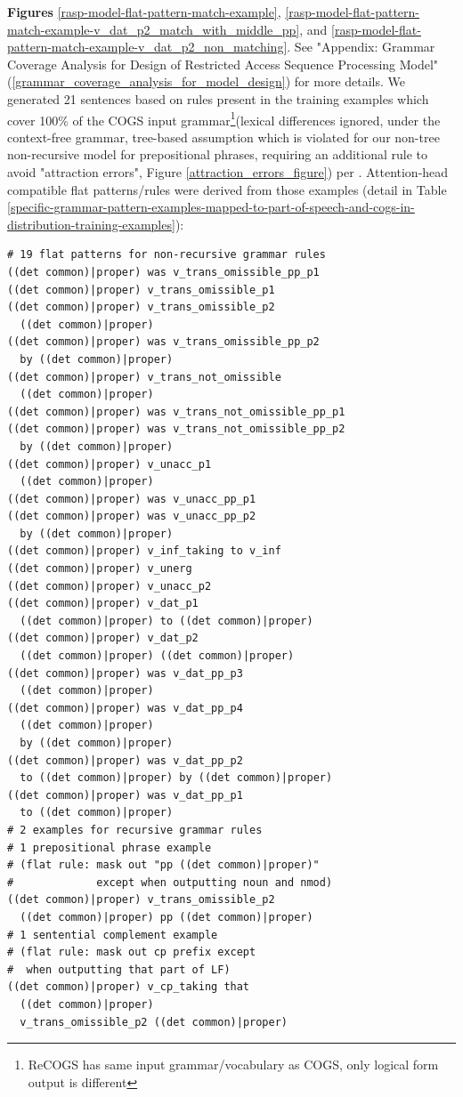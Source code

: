 \documentclass[11pt]{article}
\begin{document}
\textbf{Figures} \ref{rasp-model-flat-pattern-match-example}, \ref{rasp-model-flat-pattern-match-example-v_dat_p2_match_with_middle_pp}, and \ref{rasp-model-flat-pattern-match-example-v_dat_p2_non_matching}. See "Appendix: Grammar Coverage Analysis for Design of Restricted Access Sequence Processing Model" (\ref{grammar_coverage_analysis_for_model_design}) for more details. We generated 21 sentences based on rules present in the training examples which cover 100\% of the COGS input grammar\footnote{ReCOGS has same input grammar/vocabulary as COGS, only logical form output is different}(lexical differences ignored, under the context-free grammar, tree-based assumption which is violated for our non-tree non-recursive model for prepositional phrases, requiring an additional rule to avoid "attraction errors", Figure \ref{attraction_errors_figure}) per \cite{fuzzingbook2023:GrammarCoverageFuzzer}.
Attention-head compatible flat patterns/rules were derived from those examples (detail in Table \ref{specific-grammar-pattern-examples-mapped-to-part-of-speech-and-cogs-in-distribution-training-examples}):
\begin{tiny}
\begin{verbatim}
# 19 flat patterns for non-recursive grammar rules
((det common)|proper) was v_trans_omissible_pp_p1
((det common)|proper) v_trans_omissible_p1
((det common)|proper) v_trans_omissible_p2 
  ((det common)|proper)
((det common)|proper) was v_trans_omissible_pp_p2 
  by ((det common)|proper)
((det common)|proper) v_trans_not_omissible 
  ((det common)|proper)
((det common)|proper) was v_trans_not_omissible_pp_p1
((det common)|proper) was v_trans_not_omissible_pp_p2 
  by ((det common)|proper)
((det common)|proper) v_unacc_p1 
  ((det common)|proper)
((det common)|proper) was v_unacc_pp_p1
((det common)|proper) was v_unacc_pp_p2
  by ((det common)|proper)
((det common)|proper) v_inf_taking to v_inf
((det common)|proper) v_unerg
((det common)|proper) v_unacc_p2
((det common)|proper) v_dat_p1 
  ((det common)|proper) to ((det common)|proper)
((det common)|proper) v_dat_p2 
  ((det common)|proper) ((det common)|proper)
((det common)|proper) was v_dat_pp_p3
  ((det common)|proper)
((det common)|proper) was v_dat_pp_p4
  ((det common)|proper) 
  by ((det common)|proper)
((det common)|proper) was v_dat_pp_p2 
  to ((det common)|proper) by ((det common)|proper)
((det common)|proper) was v_dat_pp_p1
  to ((det common)|proper)
# 2 examples for recursive grammar rules
# 1 prepositional phrase example
# (flat rule: mask out "pp ((det common)|proper)" 
#             except when outputting noun and nmod)
((det common)|proper) v_trans_omissible_p2 
  ((det common)|proper) pp ((det common)|proper)
# 1 sentential complement example
# (flat rule: mask out cp prefix except 
#  when outputting that part of LF)
((det common)|proper) v_cp_taking that 
  ((det common)|proper) 
  v_trans_omissible_p2 ((det common)|proper)
\end{verbatim}
\end{tiny}
\end{document}
